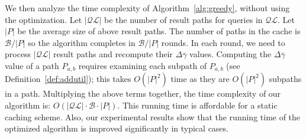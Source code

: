 \documentclass{sig-alternate}
\begin{document}
We then analyze the time complexity of Algorithm~\ref{alg:greedy}, without using the optimization.
Let $|\mathcal{QL}|$ be the number of result paths for queries in $\mathcal{QL}$.
Let $|P|$ be the average size of above result paths.
The number of paths in the cache is $\mathcal{B} / |P|$ so the algorithm completes in $\mathcal{B} / |P|$ rounds.
In each round, we need to process $|\mathcal{QL}|$ result paths and recompute their $\Delta\overline{\gamma}$ values.
Computing the $\Delta\overline{\gamma}$ value of a path $P_{a,b}$ requires examining each subpath of $P_{a,b}$ (see Definition~\ref{def:addutil});
this takes $O(|P|^2)$ time as they are $O(|P|^2)$ subpaths in a path.
Multiplying the above terms together,
the time complexity of our algorithm is: $O( |\mathcal{QL}| \cdot \mathcal{B} \cdot |P|)$.
This running time is affordable for a static caching scheme.
Also, our experimental results show that
the running time of the optimized algorithm is improved significantly in typical cases.






\end{document}
